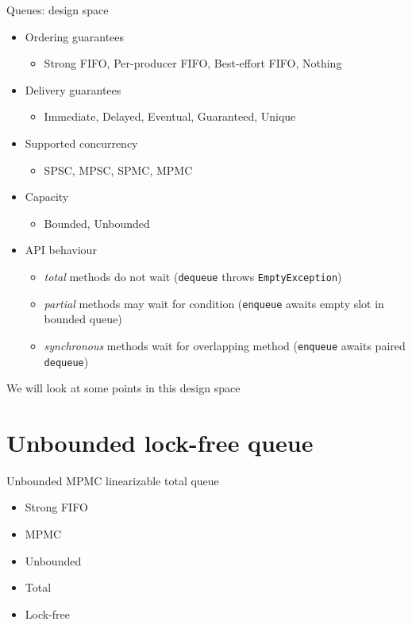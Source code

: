 \begin{frame}{Queues: design space}

\begin{itemize}
  \item Ordering guarantees
  \begin{itemize}
    \item Strong FIFO, Per-producer FIFO, Best-effort FIFO, Nothing    
  \end{itemize}
  \item Delivery guarantees 
  \begin{itemize}
    \item Immediate, Delayed, Eventual, Guaranteed, Unique
  \end{itemize}
  \item Supported concurrency
  \begin{itemize}
    \item SPSC, MPSC, SPMC, MPMC    
  \end{itemize}

  \pause \item Capacity
  \begin{itemize}
    \pause \item Bounded, Unbounded
  \end{itemize}

  \pause \item API behaviour
  \begin{itemize}
    \pause \item \textit{total} methods do not wait (\texttt{dequeue} throws \texttt{EmptyException})
    \pause \item \textit{partial} methods may wait for condition (\texttt{enqueue} awaits empty slot in bounded queue)
    \pause \item \textit{synchronous} methods wait for overlapping method (\texttt{enqueue} awaits paired \texttt{dequeue})    
  \end{itemize}
\end{itemize}

\pause

We will look at some points in this design space

\end{frame}


\section{Unbounded lock-free queue}
\showTOC

\begin{frame}{Unbounded MPMC linearizable total queue}
\begin{itemize}
    \item Strong FIFO    
    \item MPMC
    \item Unbounded
    \item Total
    \pause
    \item Lock-free
\end{itemize}
\end{frame}


